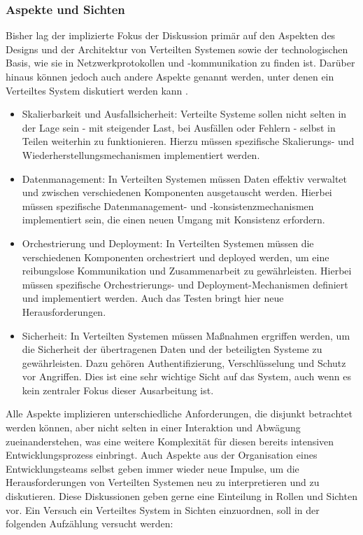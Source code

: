 \documentclass[../vs-script-first-v01.tex]{subfiles}
\begin{document}
\subsubsection{Aspekte und Sichten}
Bisher lag der implizierte Fokus der Diskussion primär auf den Aspekten des Designs und der Architektur von Verteilten Systemen sowie der technologischen Basis, wie sie in Netzwerkprotokollen und -kommunikation zu finden ist. Darüber hinaus können jedoch auch andere Aspekte genannt werden, unter denen ein Verteiltes System diskutiert werden kann \cite{tanenbaum2017distributed}. 
\begin{itemize} 
\item Skalierbarkeit und Ausfallsicherheit: Verteilte Systeme sollen nicht selten in der Lage sein -  mit steigender Last, bei Ausfällen oder Fehlern - selbst in Teilen weiterhin zu funktionieren. Hierzu müssen spezifische Skalierungs- und Wiederherstellungsmechanismen implementiert werden.
\item Datenmanagement: In Verteilten Systemen müssen Daten effektiv verwaltet und zwischen verschiedenen Komponenten ausgetauscht werden. Hierbei müssen spezifische Datenmanagement- und -konsistenzmechanismen implementiert sein, die einen neuen Umgang mit Konsistenz erfordern.
\item Orchestrierung und Deployment: In Verteilten Systemen müssen die verschiedenen Komponenten orchestriert und deployed werden, um eine reibungslose Kommunikation und Zusammenarbeit zu gewährleisten. Hierbei müssen spezifische Orchestrierungs- und Deployment-Mechanismen definiert und implementiert werden. Auch das Testen bringt hier neue Herausforderungen.
\item Sicherheit: In Verteilten Systemen müssen Maßnahmen ergriffen werden, um die Sicherheit der übertragenen Daten und der beteiligten Systeme zu gewährleisten. Dazu gehören Authentifizierung, Verschlüsselung und Schutz vor Angriffen. Dies ist eine sehr wichtige Sicht auf das System, auch wenn es kein zentraler Fokus dieser Ausarbeitung ist.
\end{itemize}	
Alle Aspekte implizieren unterschiedliche Anforderungen, die disjunkt betrachtet werden können, aber nicht selten in einer Interaktion und Abwägung zueinanderstehen, was eine weitere Komplexität für diesen bereits intensiven Entwicklungsprozess einbringt. Auch Aspekte aus der Organisation eines Entwicklungsteams selbst geben immer wieder neue Impulse, um die Herausforderungen von Verteilten Systemen neu zu interpretieren und zu diskutieren. Diese Diskussionen geben gerne eine Einteilung in Rollen und Sichten vor. Ein Versuch ein Verteiltes System in Sichten einzuordnen, soll in der folgenden Aufzählung versucht werden:
\end{document}
